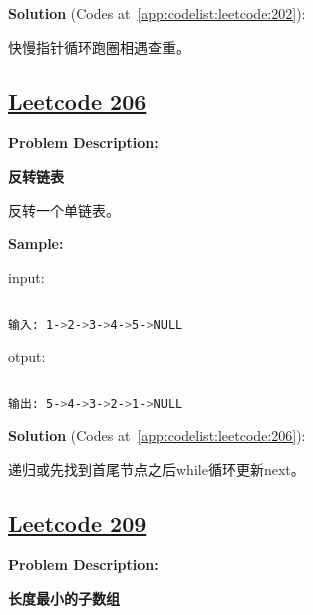 \textbf{Solution }(Codes at~\ref{app:codelist:leetcode:202}):\par

快慢指针循环跑圈相遇查重。\par



\subsection{\href{https://leetcode-cn.com/}{Leetcode 206}}\label{app:problemlist:leetcode:206}

\textbf{Problem Description:}\par

\textbf{反转链表}\par

反转一个单链表。\par


\textbf{Sample:}\par

input:\par

\begin{lstlisting}[language=bash]

输入: 1->2->3->4->5->NULL


\end{lstlisting}

otput:\par

\begin{lstlisting}[language=bash]

输出: 5->4->3->2->1->NULL


\end{lstlisting}

\textbf{Solution }(Codes at~\ref{app:codelist:leetcode:206}):\par

递归或先找到首尾节点之后while循环更新next。\par



\subsection{\href{https://leetcode-cn.com/}{Leetcode 209}}\label{app:problemlist:leetcode:209}

\textbf{Problem Description:}\par

\textbf{长度最小的子数组}\par

